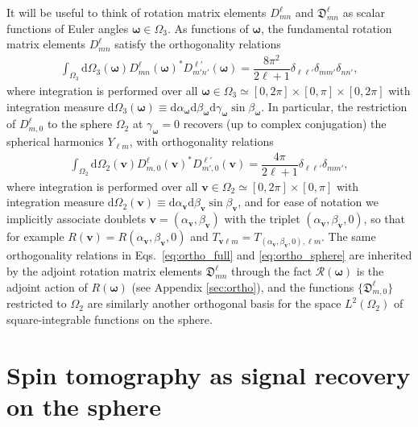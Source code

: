 \documentclass[notitlepage,twocolumn]{revtex4-2}
\newcommand{\f}[2]{\dfrac{#1}{#2}} %
\newcommand{\p}[1]{\left(#1\right)} %
\renewcommand{\set}[1]{\{#1\}} %
\renewcommand{\v}{\bm} %
\newcommand{\1}{\mathds{1}}
\newcommand{\R}{\mathcal{R}}
\newcommand{\D}{\mathfrak{D}}
\renewcommand{\d}{\text{d}}
\begin{document}
It will be useful to think of rotation matrix elements $D^\ell_{mn}$ and $\D^\ell_{mn}$ as scalar functions of Euler angles $\v\omega\in\Omega_3$.
As functions of $\v\omega$, the fundamental rotation matrix elements $D_{mn}^\ell$ satisfy the orthogonality relations \cite{brown2003rotational}
\begin{align}
  \int_{\Omega_3} \d\Omega_3\p{\v\omega}
  D^{\ell}_{mn}\p{\v\omega}^* D^{\ell'}_{m'n'}\p{\v\omega}
  = \f{8\pi^2}{2\ell+1} \delta_{\ell\ell'} \delta_{mm'} \delta_{nn'},
  \label{eq:ortho_full}
\end{align}
where integration is performed over all $\v\omega\in\Omega_3\simeq[0,2\pi]\times[0,\pi]\times[0,2\pi]$ with integration measure $\d\Omega_3\p{\v\omega} \equiv \d\alpha_{\v\omega} \d\beta_{\v\omega} \d\gamma_{\v\omega} \sin\beta_{\v\omega}$.
In particular, the restriction of $D^\ell_{m,0}$ to the sphere $\Omega_2$ at $\gamma_{\v\omega}=0$ recovers (up to complex conjugation) the spherical harmonics $Y_{\ell m}$, with orthogonality relations
\begin{align}
  \int_{\Omega_2} \d\Omega_2\p{\v v}
  D^{\ell}_{m,0}\p{\v v}^* D^{\ell'}_{m',0}\p{\v v}
  = \f{4\pi}{2\ell+1} \delta_{\ell\ell'} \delta_{mm'},
  \label{eq:ortho_sphere}
\end{align}
where integration is performed over all $\v v\in\Omega_2\simeq[0,2\pi]\times[0,\pi]$ with integration measure $\d\Omega_2\p{\v v} \equiv \d\alpha_{\v v} \d\beta_{\v v} \sin\beta_{\v v}$, and for ease of notation we implicitly associate doublets $\v v=\p{\alpha_{\v v},\beta_{\v v}}$ with the triplet $\p{\alpha_{\v v},\beta_{\v v},0}$, so that for example $R\p{\v v} = R\p{\alpha_{\v v},\beta_{\v v},0}$ and $T_{\v v\ell m} = T_{\p{\alpha_{\v v},\beta_{\v v},0},\ell m}$.
The same orthogonality relations in Eqs.~\eqref{eq:ortho_full} and \eqref{eq:ortho_sphere} are inherited by the adjoint rotation matrix elements $\D_{mn}^\ell$ through the fact $\R\p{\v\omega}$ is the adjoint action of $R\p{\v\omega}$ (see Appendix \ref{sec:ortho}), and the functions $\set{\D_{m,0}^\ell}$ restricted to $\Omega_2$ are similarly another orthogonal basis for the space $L^2\p{\Omega_2}$ of square-integrable functions on the sphere.

\section{Spin tomography as signal recovery on the sphere}
\label{sec:signal_recovery}
\end{document}

